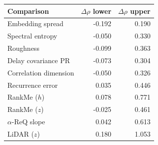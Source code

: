 \begin{tabular}{lrr}
\toprule
Comparison & $\Delta\rho$ lower & $\Delta\rho$ upper \\
\midrule
Embedding spread & -0.192 & 0.190 \\
Spectral entropy & -0.050 & 0.330 \\
Roughness & -0.099 & 0.363 \\
Delay covariance PR & -0.073 & 0.304 \\
Correlation dimension & -0.050 & 0.326 \\
Recurrence error & 0.035 & 0.446 \\
RankMe ($h$) & 0.078 & 0.771 \\
RankMe ($z$) & -0.025 & 0.461 \\
$\alpha$-ReQ slope & 0.042 & 0.613 \\
LiDAR ($z$) & 0.180 & 1.053 \\
\bottomrule
\end{tabular}
